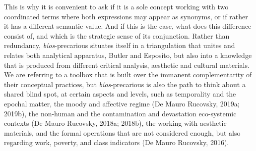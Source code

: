 \documentclass[a4paper,]{scrartcl}
\begin{document}
This is why it is convenient to ask if it is a sole concept working with
two coordinated terms where both expressions may appear as synonyms, or
if rather it has a different semantic value. And if this is the case,
what does this difference consist of, and which is the strategic sense
of its conjunction. Rather than redundancy, \emph{bíos}-precarious
situates itself in a triangulation that unites and relates both
analytical apparatus, Butler and Esposito, but also into a knowledge
that is produced from different critical analysis, aesthetic and
cultural materials. We are referring to a toolbox that is built over the
immanent complementarity of their conceptual practices, but
\emph{bíos}-precarious is also the path to think about a shared blind
spot, at certain aspects and levels, such as temporality and the epochal
matter, the moody and affective regime (De Mauro Rucovsky, 2019a;
2019b), the non-human and the contamination and devastation eco-systemic
contexts (De Mauro Rucovsky, 2018a; 2018b), the working with aesthetic
materials, and the formal operations that are not considered enough, but
also regarding work, poverty, and class indicators (De Mauro Rucovsky,
2016).
\end{document}

